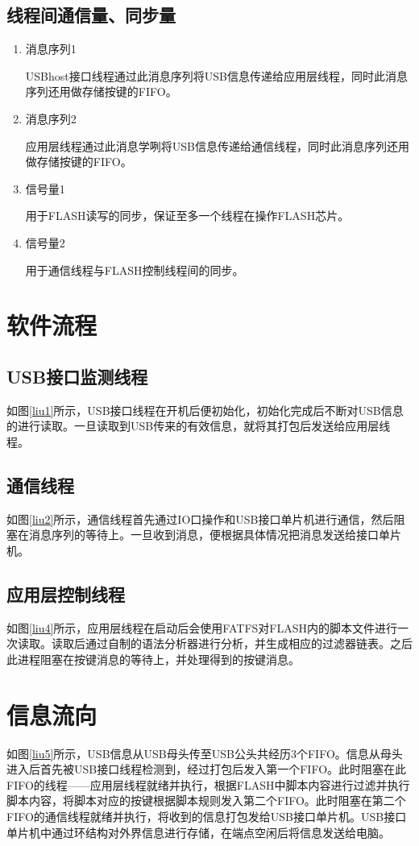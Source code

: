 \subsection{线程间通信量、同步量}
\begin{enumerate}
\item 消息序列1

USBhost接口线程通过此消息序列将USB信息传递给应用层线程，同时此消息序列还用做存储按键的FIFO。
\item 消息序列2

应用层线程通过此消息学咧将USB信息传递给通信线程，同时此消息序列还用做存储按键的FIFO。
\item 信号量1

用于FLASH读写的同步，保证至多一个线程在操作FLASH芯片。
\item 信号量2

用于通信线程与FLASH控制线程间的同步。
\end{enumerate}


\section{软件流程}
\subsection{USB接口监测线程}
如图\ref{liu1}所示，USB接口线程在开机后便初始化，初始化完成后不断对USB信息的进行读取。一旦读取到USB传来的有效信息，就将其打包后发送给应用层线程。

\subsection{通信线程}
如图\ref{liu2}所示，通信线程首先通过IO口操作和USB接口单片机进行通信，然后阻塞在消息序列的等待上。一旦收到消息，便根据具体情况把消息发送给接口单片机。

\subsection{应用层控制线程}
如图\ref{liu4}所示，应用层线程在启动后会使用FATFS对FLASH内的脚本文件进行一次读取。读取后通过自制的语法分析器进行分析，并生成相应的过滤器链表。之后此进程阻塞在按键消息的等待上，并处理得到的按键消息。

\section{信息流向}
如图\ref{liu5}所示，USB信息从USB母头传至USB公头共经历3个FIFO。信息从母头进入后首先被USB接口线程检测到，经过打包后发入第一个FIFO。此时阻塞在此FIFO的线程——应用层线程就绪并执行，根据FLASH中脚本内容进行过滤并执行脚本内容，将脚本对应的按键根据脚本规则发入第二个FIFO。此时阻塞在第二个FIFO的通信线程就绪并执行，将收到的信息打包发给USB接口单片机。USB接口单片机中通过环结构对外界信息进行存储，在端点空闲后将信息发送给电脑。


